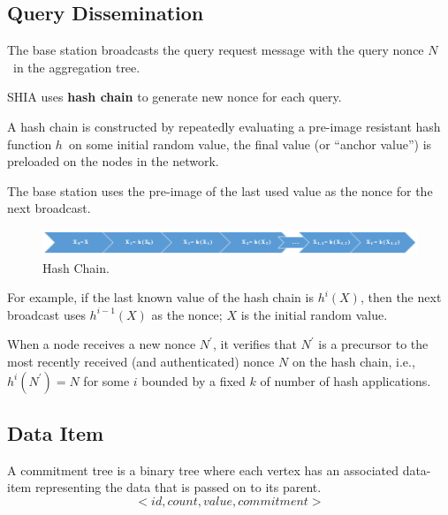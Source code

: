 \documentclass[%
  slidesonly,%
  semlayer%
  ]{seminar}                                  %
\begin{document}
\begin{slide}
    \subsection*{Query Dissemination}
      \vfill
      The base station broadcasts the query request message with the query nonce $N$\ in the aggregation tree. 
    
      SHIA uses \textbf{hash chain} to generate new nonce for each query. 
      
      A hash chain is constructed by repeatedly evaluating a pre-image resistant hash function $h$\ on some initial random value, the final value (or ``anchor value'') is preloaded on the nodes in the network.
      
      The base station uses the pre-image of the last used value as the nonce for the next broadcast.
      
      \begin{figure}[h!]
        \centering
        \includegraphics[scale=0.4]{images/hash-chain.png}
        \caption{Hash Chain.}
        \label{fig:hash-chain}
      \end{figure}

      For example, if the last known value of the hash chain is $h^i(X)$, then the next broadcast uses $h^{i-1}(X)$ as the nonce; $X$ is the initial random value.
      
      When a node receives a new nonce $N^{'}$, it verifies that $N^{'}$ is a precursor to the most recently received (and authenticated) nonce $N$ on the hash chain, i.e., $h^{i}(N^{'}) = N$ for some $i$ bounded by a fixed $k$ of number of hash applications.  
      \vfill
      \clearpage

    
    \subsection*{Data Item}
      \vfill
      A commitment tree is a binary tree where each vertex has an associated data-item representing the data that is passed on to its parent.
      \begin{equation*}
        < id, count, value, commitment >
      \end{equation*}


\end{slide}
\end{document}

